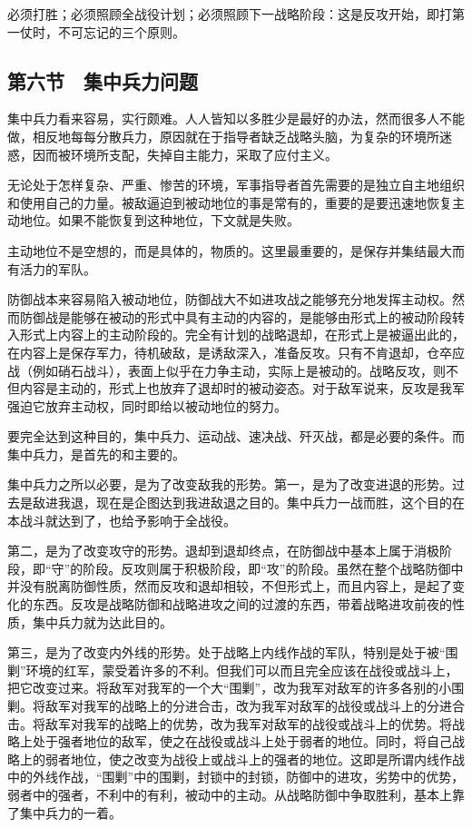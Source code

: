 必须打胜；必须照顾全战役计划；必须照顾下一战略阶段：这是反攻开始，即打第一仗时，不可忘记的三个原则。

\subsection{第六节　集中兵力问题}

集中兵力看来容易，实行颇难。人人皆知以多胜少是最好的办法，然而很多人不能做，相反地每每分散兵力，原因就在于指导者缺乏战略头脑，为复杂的环境所迷惑，因而被环境所支配，失掉自主能力，采取了应付主义。

无论处于怎样复杂、严重、惨苦的环境，军事指导者首先需要的是独立自主地组织和使用自己的力量。被敌逼迫到被动地位的事是常有的，重要的是要迅速地恢复主动地位。如果不能恢复到这种地位，下文就是失败。

主动地位不是空想的，而是具体的，物质的。这里最重要的，是保存并集结最大而有活力的军队。

防御战本来容易陷入被动地位，防御战大不如进攻战之能够充分地发挥主动权。然而防御战是能够在被动的形式中具有主动的内容的，是能够由形式上的被动阶段转入形式上内容上的主动阶段的。完全有计划的战略退却，在形式上是被逼出此的，在内容上是保存军力，待机破敌，是诱敌深入，准备反攻。只有不肯退却，仓卒应战（例如硝石战斗），表面上似乎在力争主动，实际上是被动的。战略反攻，则不但内容是主动的，形式上也放弃了退却时的被动姿态。对于敌军说来，反攻是我军强迫它放弃主动权，同时即给以被动地位的努力。

要完全达到这种目的，集中兵力、运动战、速决战、歼灭战，都是必要的条件。而集中兵力，是首先的和主要的。

集中兵力之所以必要，是为了改变敌我的形势。第一，是为了改变进退的形势。过去是敌进我退，现在是企图达到我进敌退之目的。集中兵力一战而胜，这个目的在本战斗就达到了，也给予影响于全战役。

第二，是为了改变攻守的形势。退却到退却终点，在防御战中基本上属于消极阶段，即“守”的阶段。反攻则属于积极阶段，即“攻”的阶段。虽然在整个战略防御中并没有脱离防御性质，然而反攻和退却相较，不但形式上，而且内容上，是起了变化的东西。反攻是战略防御和战略进攻之间的过渡的东西，带着战略进攻前夜的性质，集中兵力就为达此目的。

第三，是为了改变内外线的形势。处于战略上内线作战的军队，特别是处于被“围剿”环境的红军，蒙受着许多的不利。但我们可以而且完全应该在战役或战斗上，把它改变过来。将敌军对我军的一个大“围剿”，改为我军对敌军的许多各别的小围剿。将敌军对我军的战略上的分进合击，改为我军对敌军的战役或战斗上的分进合击。将敌军对我军的战略上的优势，改为我军对敌军的战役或战斗上的优势。将战略上处于强者地位的敌军，使之在战役或战斗上处于弱者的地位。同时，将自己战略上的弱者地位，使之改变为战役上或战斗上的强者的地位。这即是所谓内线作战中的外线作战，“围剿”中的围剿，封锁中的封锁，防御中的进攻，劣势中的优势，弱者中的强者，不利中的有利，被动中的主动。从战略防御中争取胜利，基本上靠了集中兵力的一着。

